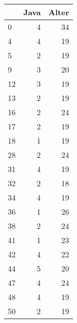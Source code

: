 \begin{tabular}{lrr}
\toprule
{} &  Java &  Alter \\
\midrule
0  &     4 &     34 \\
4  &     4 &     19 \\
5  &     2 &     19 \\
9  &     3 &     20 \\
12 &     3 &     19 \\
13 &     2 &     19 \\
16 &     2 &     24 \\
17 &     2 &     19 \\
18 &     1 &     19 \\
28 &     2 &     24 \\
31 &     4 &     19 \\
32 &     2 &     18 \\
34 &     4 &     19 \\
36 &     1 &     26 \\
38 &     2 &     24 \\
41 &     1 &     23 \\
42 &     4 &     22 \\
44 &     5 &     20 \\
47 &     4 &     24 \\
48 &     4 &     19 \\
50 &     2 &     19 \\
\bottomrule
\end{tabular}
